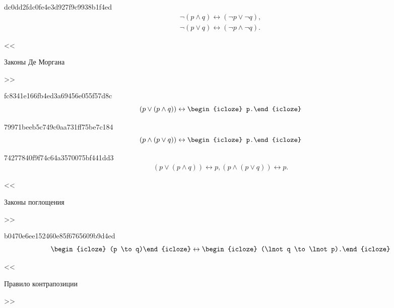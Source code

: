 \begin{note}{dc0dd2fdc0fe4e3d927f9c9938b1f4ed}
    \[
        \begin{gathered}
            \lnot (p \land q) \leftrightarrow (\lnot p \lor \lnot q), \\
            \lnot (p \lor q) \leftrightarrow (\lnot p \land \lnot q).
        \end{gathered}
    \]

    \begin{center}
        \tiny
        <<\begin{icloze}{1}Законы Де Моргана\end{icloze}>>
    \end{center}
\end{note}

\begin{note}{fc8341e166fb4ed3a69456e055f57d8c}
    \[
        (p \lor (p \land q)) \leftrightarrow \begin{icloze}{1}p.\end{icloze}
    \]
\end{note}

\begin{note}{79971beeb5c749c0aa731ff75be7c184}
    \[
        (p \land (p \lor q)) \leftrightarrow \begin{icloze}{1}p.\end{icloze}
    \]
\end{note}

\begin{note}{74277840f9f74c64a3570075bf441dd3}
    \begin{gather*}
        (p \lor (p \land q)) \leftrightarrow p,
        (p \land (p \lor q)) \leftrightarrow p.
    \end{gather*}

    \begin{center}
        \tiny
        <<\begin{icloze}{1}Законы поглощения\end{icloze}>>
    \end{center}
\end{note}

\begin{note}{b0470e6ee152460e85f6765609b9d4ed}
    \[
        \begin{icloze}{2}(p \to q)\end{icloze} \leftrightarrow \begin{icloze}{1}(\lnot q \to \lnot p).\end{icloze}
    \]

    \begin{center}
        \tiny
        <<\begin{icloze}{3}Правило контрапозиции\end{icloze}>>
    \end{center}
\end{note}

